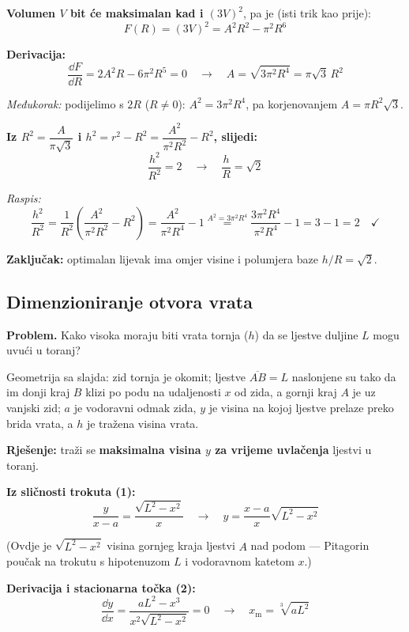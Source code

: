 \textbf{Volumen $V$ bit će maksimalan kad i $(3V)^2$}, pa je (isti trik kao
prije):
\[
F(R) = (3V)^2 = A^2R^2 - \pi^2R^6
\]

\textbf{Derivacija:}
\[
\frac{\dd F}{\dd R} = 2A^2R - 6\pi^2R^5 = 0 \quad \to \quad
A = \sqrt{3\pi^2R^4} = \pi\sqrt{3}\,R^2
\]

\emph{Međukorak:} podijelimo s $2R$ ($R \ne 0$): $A^2 = 3\pi^2R^4$, pa
korjenovanjem $A = \pi R^2\sqrt{3}$.

\textbf{Iz $R^2 = \dfrac{A}{\pi\sqrt{3}}$ i
$h^2 = r^2 - R^2 = \dfrac{A^2}{\pi^2R^2} - R^2$, slijedi:}
\[
\frac{h^2}{R^2} = 2 \quad \to \quad \frac{h}{R} = \sqrt{2}
\]

\emph{Raspis:}
\[
\frac{h^2}{R^2} = \frac{1}{R^2}\left(\frac{A^2}{\pi^2R^2} - R^2\right)
= \frac{A^2}{\pi^2R^4} - 1
\overset{A^2 = 3\pi^2R^4}{=} \frac{3\pi^2R^4}{\pi^2R^4} - 1 = 3 - 1 = 2
\quad \checkmark
\]

\textbf{Zaključak:} optimalan lijevak ima omjer visine i polumjera baze
$h/R = \sqrt{2}$.

\subsection{Dimenzioniranje otvora vrata}

\textbf{Problem.} Kako visoka moraju biti vrata tornja ($h$) da se ljestve
duljine $L$ mogu uvući u toranj?

Geometrija sa slajda: zid tornja je okomit; ljestve $\overline{AB} = L$
naslonjene su tako da im donji kraj $B$ klizi po podu na udaljenosti $x$ od
zida, a gornji kraj $A$ je uz vanjski zid; $a$ je vodoravni odmak zida, $y$ je
visina na kojoj ljestve prelaze preko brida vrata, a $h$ je tražena visina
vrata.

\textbf{Rješenje:} traži se \textbf{maksimalna visina $y$ za vrijeme uvlačenja}
ljestvi u toranj.

\textbf{Iz sličnosti trokuta (1):}
\begin{equation}
\frac{y}{x-a} = \frac{\sqrt{L^2 - x^2}}{x}
\quad \to \quad
y = \frac{x-a}{x}\sqrt{L^2 - x^2}
\end{equation}

(Ovdje je $\sqrt{L^2 - x^2}$ visina gornjeg kraja ljestvi $A$ nad podom ---
Pitagorin poučak na trokutu s hipotenuzom $L$ i vodoravnom katetom $x$.)

\textbf{Derivacija i stacionarna točka (2):}
\begin{equation}
\frac{\dd y}{\dd x} = \frac{aL^2 - x^3}{x^2\sqrt{L^2 - x^2}} = 0
\quad \to \quad x_{\mathrm m} = \sqrt[3]{aL^2}
\end{equation}

